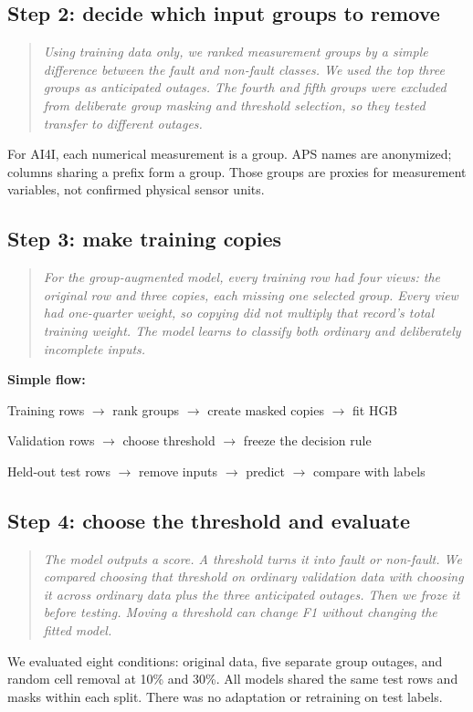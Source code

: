 \documentclass[11pt,a4paper]{article}
\newcommand{\say}[1]{\begin{quote}\itshape #1\end{quote}}
\begin{document}
\subsection*{Step 2: decide which input groups to remove}
\say{Using training data only, we ranked measurement groups by a simple difference between the fault and non-fault classes. We used the top three groups as anticipated outages. The fourth and fifth groups were excluded from deliberate group masking and threshold selection, so they tested transfer to different outages.}

For AI4I, each numerical measurement is a group. APS names are anonymized; columns sharing a prefix form a group. Those groups are proxies for measurement variables, not confirmed physical sensor units.

\subsection*{Step 3: make training copies}
\say{For the group-augmented model, every training row had four views: the original row and three copies, each missing one selected group. Every view had one-quarter weight, so copying did not multiply that record's total training weight. The model learns to classify both ordinary and deliberately incomplete inputs.}

\textbf{Simple flow:}\par
Training rows $\rightarrow$ rank groups $\rightarrow$ create masked copies $\rightarrow$ fit HGB\par
Validation rows $\rightarrow$ choose threshold $\rightarrow$ freeze the decision rule\par
Held-out test rows $\rightarrow$ remove inputs $\rightarrow$ predict $\rightarrow$ compare with labels

\subsection*{Step 4: choose the threshold and evaluate}
\say{The model outputs a score. A threshold turns it into fault or non-fault. We compared choosing that threshold on ordinary validation data with choosing it across ordinary data plus the three anticipated outages. Then we froze it before testing. Moving a threshold can change F1 without changing the fitted model.}

We evaluated eight conditions: original data, five separate group outages, and random cell removal at 10\% and 30\%. All models shared the same test rows and masks within each split. There was no adaptation or retraining on test labels.
\end{document}

